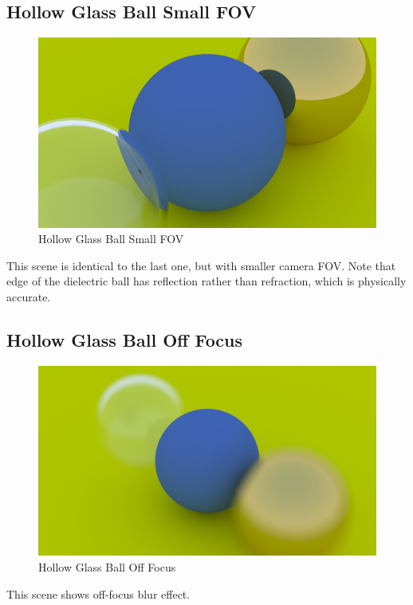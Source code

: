 \documentclass[utf8]{article}
\begin{document}
\subsection{Hollow Glass Ball Small FOV}
\begin{figure}[H]
	\centering
	\includegraphics[width=0.7\linewidth]{../_results/hollow_glass_ball_small_fov}
	\caption{Hollow Glass Ball Small FOV}
	\label{fig:hollowglassballsmallfov}
\end{figure}
This scene is identical to the last one, but with smaller camera FOV. Note that edge of the dielectric ball has reflection rather than refraction, which is physically accurate.

\subsection{Hollow Glass Ball Off Focus}
\begin{figure}[H]
	\centering
	\includegraphics[width=0.7\linewidth]{../_results/hollow_glass_ball_off_focus}
	\caption{Hollow Glass Ball Off Focus}
	\label{fig:hollowglassballofffocus}
\end{figure}
This scene shows off-focus blur effect.
\end{document}
